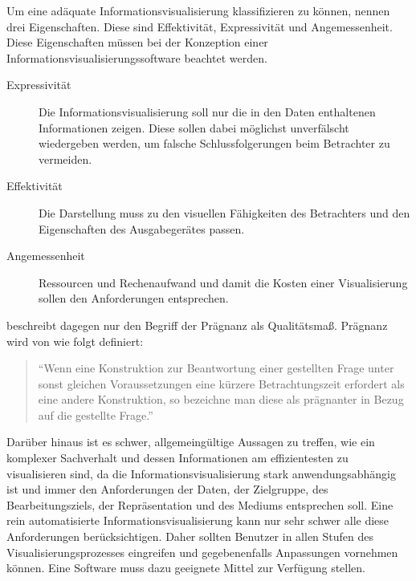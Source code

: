 \documentclass[a4paper, 
               12pt,
               DIV=calc,
               version=first,
               pdftex,
               headsepline,
               footsepline,
               bibtotocnumbered,
               liststotocnumbered]{scrreprt}
\begin{document}
Um eine adäquate Informationsvisualisierung klassifizieren zu können, nennen \citep{Schumann} drei Eigenschaften.
Diese sind Effektivität, Expressivität und Angemessenheit. Diese Eigenschaften müssen bei der Konzeption einer
Informationsvisualisierungssoftware beachtet werden.
\begin{description}
\item[Expressivität]
Die Informationsvisualisierung soll nur die in den Daten enthaltenen Informationen zeigen.
Diese sollen dabei möglichst unverfälscht wiedergeben werden, um falsche Schlussfolgerungen beim Betrachter zu vermeiden.
\item[Effektivität]
Die Darstellung muss zu den visuellen Fähigkeiten des Betrachters und den Eigenschaften des Ausgabegerätes
passen.
\item[Angemessenheit]
Ressourcen und Rechenaufwand und damit die Kosten einer Visualisierung sollen den Anforderungen entsprechen.
\end{description}
\citep{Bertin} beschreibt dagegen nur den Begriff der Prägnanz als Qualitätsmaß.
Prägnanz wird von \citep[S.\,17]{Bertin} wie folgt definiert:
\begin{quote}
"`Wenn eine Konstruktion zur Beantwortung einer gestellten Frage unter sonst gleichen Voraussetzungen eine
kürzere Betrachtungszeit erfordert als eine andere Konstruktion, so bezeichne man diese als prägnanter in
Bezug auf die gestellte Frage."'
\end{quote}
Darüber hinaus ist es schwer, allgemeingültige Aussagen zu treffen, wie ein komplexer Sachverhalt und dessen
Informationen am effizientesten zu visualisieren sind, da die Informationsvisualisierung stark anwendungsabhängig ist und
immer den Anforderungen der Daten, der Zielgruppe, des Bearbeitungsziels, der Repräsentation und des Mediums entsprechen soll.
Eine rein automatisierte Informationsvisualisierung kann nur sehr schwer alle diese Anforderungen berücksichtigen. Daher
sollten Benutzer in allen Stufen des Visualisierungsprozesses eingreifen und gegebenenfalls Anpassungen vornehmen können. Eine Software
muss dazu geeignete Mittel zur Verfügung stellen.
\end{document}
